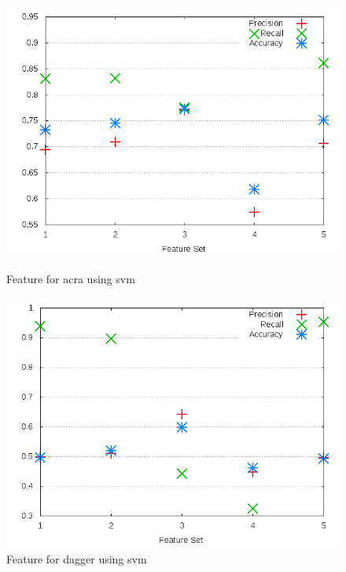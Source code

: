 \begin{figure}[h]
    \centering

    \begin{minipage}[b]{0.45\linewidth}
        \includegraphics[width=1.0\textwidth]{images/svm/test_3/acra_sample_range}
        \caption{Feature for acra using \gls{svm}}
        \label{fig:test_3_acra_svm}
    \end{minipage}
\quad
    \begin{minipage}[b]{0.45\linewidth}
        \includegraphics[width=1.0\textwidth]{images/svm/test_3/dagger_sample_range}
        \caption{Feature for dagger using \gls{svm}}
        \label{fig:test_3_dagger_svm}
    \end{minipage}
\end{figure}

